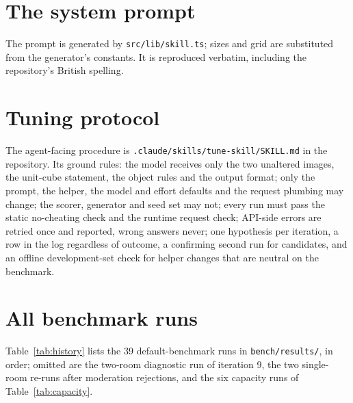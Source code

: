 \documentclass[10pt,a4paper]{article}
\begin{document}
\appendix

\section{The system prompt}
\label{app:prompt}
The prompt is generated by \texttt{src/lib/skill.ts}; sizes and grid are substituted from the generator's constants. It is reproduced verbatim, including the repository's British spelling.


\section{Tuning protocol}
\label{app:protocol}
The agent-facing procedure is \texttt{.claude/skills/tune-skill/SKILL.md} in the repository. Its ground rules: the model receives only the two unaltered images, the unit-cube statement, the object rules and the output format; only the prompt, the helper, the model and effort defaults and the request plumbing may change; the scorer, generator and seed set may not; every run must pass the static no-cheating check and the runtime request check; API-side errors are retried once and reported, wrong answers never; one hypothesis per iteration, a row in the log regardless of outcome, a confirming second run for candidates, and an offline development-set check for helper changes that are neutral on the benchmark.

\section{All benchmark runs}
\label{app:runs}
Table~\ref{tab:history} lists the 39 default-benchmark runs in \texttt{bench/results/}, in order; omitted are the two-room diagnostic run of iteration 9, the two single-room re-runs after moderation rejections, and the six capacity runs of Table~\ref{tab:capacity}.

\begin{table}[p]
\centering\scriptsize
\caption{Every default-benchmark run. Cells is the mean number of code-interpreter calls per room. Iteration 16's confirmation shows 88.3 because the rejected room is counted as zero in the file; with the substituted re-run the log records 98.3.}
\label{tab:history}

\end{table}
\end{document}

